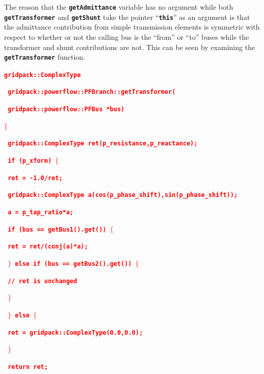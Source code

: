 \documentclass[12pt]{report} %
\begin{document}
The reason that the \texttt{\textbf{getAdmittance}} variable has no argument while both \texttt{\textbf{getTransformer}} and \texttt{\textbf{getShunt}} take the pointer ``\texttt{\textbf{this}}'' as an argument is that the admittance contribution from simple transmission elements is symmetric with respect to whether or not the calling bus is the ``from'' or ``to'' buses while the transformer and shunt contributions are not. This can be seen by examining the \texttt{\textbf{getTransformer}} function.

\textcolor{red}{\texttt{\textbf{gridpack::ComplexType}}}

\textcolor{red}{\texttt{\textbf{  gridpack::powerflow::PFBranch::getTransformer(}}}

\textcolor{red}{\texttt{\textbf{    gridpack::powerflow::PFBus *bus)}}}

\textcolor{red}{\texttt{\textbf{$\boldsymbol{\mathrm{\{}}$}}}

\textcolor{red}{\texttt{\textbf{  gridpack::ComplexType ret(p\_resistance,p\_reactance);}}}

\textcolor{red}{\texttt{\textbf{  if (p\_xform) $\boldsymbol{\mathrm{\{}}$}}}

\textcolor{red}{\texttt{\textbf{    ret = -1.0/ret;}}}

\textcolor{red}{\texttt{\textbf{    gridpack::ComplexType a(cos(p\_phase\_shift),sin(p\_phase\_shift));}}}

\textcolor{red}{\texttt{\textbf{    a = p\_tap\_ratio*a;}}}

\textcolor{red}{\texttt{\textbf{    if (bus == getBus1().get()) $\boldsymbol{\mathrm{\{}}$}}}

\textcolor{red}{\texttt{\textbf{      ret = ret/(conj(a)*a);}}}

\textcolor{red}{\texttt{\textbf{    $\boldsymbol{\mathrm{\}}}$ else if (bus == getBus2().get()) $\boldsymbol{\mathrm{\{}}$}}}

\textcolor{red}{\texttt{\textbf{      // ret is unchanged}}}

\textcolor{red}{\texttt{\textbf{    $\boldsymbol{\mathrm{\}}}$}}}

\textcolor{red}{\texttt{\textbf{  $\boldsymbol{\mathrm{\}}}$ else $\boldsymbol{\mathrm{\{}}$}}}

\textcolor{red}{\texttt{\textbf{    ret = gridpack::ComplexType(0.0,0.0);}}}

\textcolor{red}{\texttt{\textbf{  $\boldsymbol{\mathrm{\}}}$}}}

\textcolor{red}{\texttt{\textbf{  return ret;}}}
\end{document}
